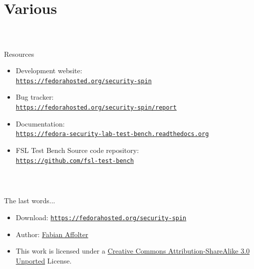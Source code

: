 \section{Various}
%
\begin{frame}
\frametitle{\\}
%
{\LARGE Resources \newline}
\begin{itemize}
  \item Development website: \\ {\scriptsize\texttt{\href{https://fedorahosted.org/security-spin}{https://fedorahosted.org/security-spin}}}
  \item Bug tracker: \\ {\scriptsize\texttt{\href{https://fedorahosted.org/security-spin/report}{https://fedorahosted.org/security-spin/report}}}
  \item Documentation: \\ {\scriptsize\texttt{\href{https://fedora-security-lab-test-bench.readthedocs.org}{https://fedora-security-lab-test-bench.readthedocs.org}}}
  \item FSL Test Bench Source code repository: \\ {\scriptsize \texttt{\href{https://github.com/fsl-test-bench}{https://github.com/fsl-test-bench}}}
\end{itemize}
\end{frame}
%
\begin{frame}
\frametitle{\\}
%
{\LARGE The last words... \newline}
\begin{itemize}
  \item Download: {\scriptsize\texttt{\href{https://fedorahosted.org/security-spin}{https://fedorahosted.org/security-spin}}}
  \item Author: \href{mailto:fab@fedoraproject.org}{Fabian Affolter}
  \item This work is licensed under a \href{http://creativecommons.org/licenses/by-sa/3.0/deed.en_US}{Creative Commons Attribution-ShareAlike 3.0 Unported} License. 
\end{itemize}
\end{frame}
%
